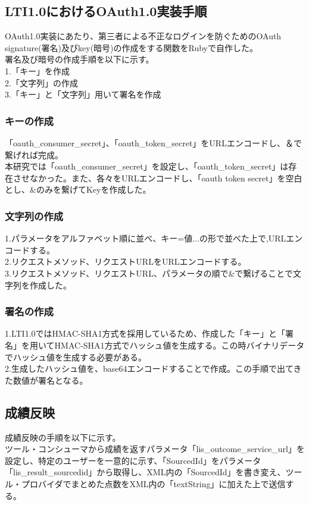 \subsection{LTI1.0におけるOAuth1.0実装手順}
OAuth1.0実装にあたり、第三者による不正なログインを防ぐためのOAuth signature(署名)及びkey(暗号)の作成をする関数をRubyで自作した。\\
署名及び暗号の作成手順を以下に示す。\\
1.「キー」を作成\\
2.「文字列」の作成\\
3.「キー」と「文字列」用いて署名を作成\\
\subsubsection{キーの作成}
「oauth\_consumer\_secret」、「oauth\_token\_secret」をURLエンコードし、＆で繋げれば完成。\\
本研究では「oauth\_consumer\_secret」を設定し、「oauth\_token\_secret」は存在させなかった。また、各々をURLエンコードし、「oauth token secret」を空白とし、\&のみを繋げてKeyを作成した。
\subsubsection{文字列の作成}
1.パラメータをアルファベット順に並べ、キー=値...の形で並べた上で,URLエンコードする。\\
2.リクエストメソッド、リクエストURLをURLエンコードする。\\
3.リクエストメソッド、リクエストURL、パラメータの順で\&で繋げることで文字列を作成した。\\
\subsubsection{署名の作成}
1.LTI1.0ではHMAC-SHA1方式を採用しているため、作成した「キー」と「署名」を用いてHMAC-SHA1方式でハッシュ値を生成する。この時バイナリデータでハッシュ値を生成する必要がある。\\
2.生成したハッシュ値を、base64エンコードすることで作成。この手順で出てきた数値が署名となる。\\
\subsection{成績反映}
成績反映の手順を以下に示す。\\
ツール・コンシューマから成績を返すパラメータ「lis\_outcome\_service\_url」を設定し、特定のユーザーを一意的に示す、「SourcedId」をパラメータ「lis\_result\_sourcedid」から取得し、XML内の「SourcedId」を書き変え、ツール・プロバイダでまとめた点数をXML内の「textString」に加えた上で送信する。\\
